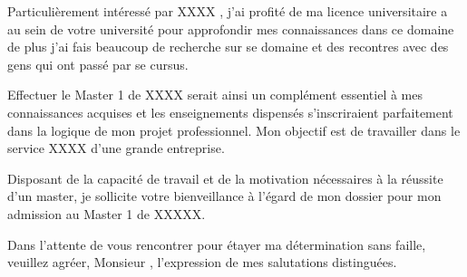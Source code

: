 \documentclass[11pt,a4paper,sans]{moderncv}
\begin{document}
    Particulièrement intéressé par XXXX , j’ai profité de ma licence universitaire a au sein de votre université pour approfondir mes connaissances dans ce domaine de plus j'ai fais beaucoup de recherche sur se domaine et des recontres avec des gens qui ont passé par se cursus. 

Effectuer le Master 1 de XXXX serait ainsi un complément essentiel à mes connaissances acquises et les enseignements dispensés s’inscriraient parfaitement dans la logique de mon projet professionnel. Mon objectif est de travailler dans le service XXXX d’une grande entreprise. 

Disposant de la capacité de travail et de la motivation nécessaires à la réussite d’un master, je sollicite votre bienveillance à l’égard de mon dossier pour mon admission au Master 1 de XXXXX.

Dans l’attente de vous rencontrer pour étayer ma détermination sans faille, veuillez agréer, Monsieur , l’expression de mes salutations distinguées.
\end{document}
